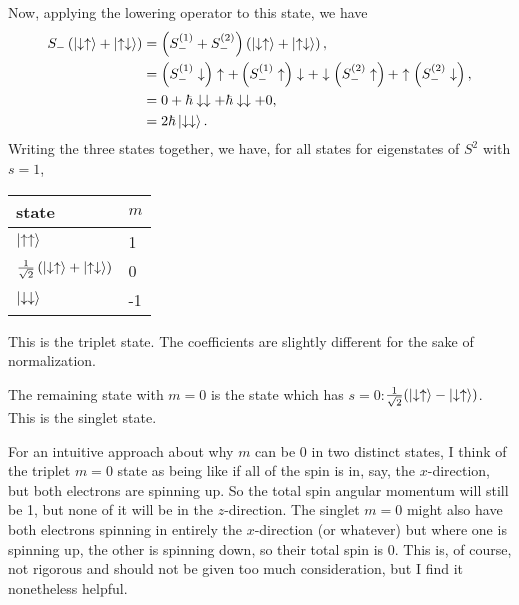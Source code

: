 \documentclass[11pt]{paper}
\begin{document}
Now, applying the lowering operator to this state, we have
\begin{align}
S_-\left(\ket{\downarrow\uparrow}+\ket{\uparrow\downarrow}\right) &=\left(S^{(1)}_-+S^{(2)}_-\right)\left(\ket{\downarrow\uparrow}+\ket{\uparrow\downarrow}\right),\\
&=\left(S_-^{(1)}\downarrow\right)\uparrow+\left(S_-^{(1)}\uparrow\right)\downarrow+\downarrow\left(S_-^{(2)}\uparrow\right)+\uparrow\left(S_-^{(2)}\downarrow\right),\\
&=0+\hbar\downarrow\downarrow + \hbar\downarrow\downarrow+0,\\
&=2\hbar\ket{\downarrow\downarrow}.
\end{align}
Writing the three states together, we have, for all states for eigenstates of $S^2$ with $s=1$,

\begin{table}[h]
\centering
\bgroup
\def\arraystretch{1.5}
\begin{tabular}{ll}
state                   & $m$                       \\ \hline
\multicolumn{1}{|l|}{$\ket{\uparrow\uparrow}$} & \multicolumn{1}{l|}{1}  \\ \hline
\multicolumn{1}{|l|}{$\frac{1}{\sqrt{2}}\left(\ket{\downarrow\uparrow}+\ket{\uparrow\downarrow}\right)$} & \multicolumn{1}{l|}{0}  \\ \hline
\multicolumn{1}{|l|}{$\ket{\downarrow\downarrow}$} & \multicolumn{1}{l|}{-1} \\ \hline
\end{tabular}
\egroup
\end{table}
This is the triplet state.  The coefficients are slightly different for the sake of normalization.

The remaining state with $m=0$ is the state which has $s=0$:$\frac{1}{\sqrt{2}}(\ket{\downarrow\uparrow}-\ket{\downarrow\uparrow})$.  This is the singlet state.

For an intuitive approach about why $m$ can be $0$ in two distinct states, I think of the triplet $m=0$ state as being like if all of the spin is in, say, the $x$-direction, but both electrons are spinning up.  So the total spin angular momentum will still be 1, but none of it will be in the $z$-direction.  The singlet $m=0$ might also have both electrons spinning in entirely the $x$-direction (or whatever) but where one is spinning up, the other is spinning down, so their total spin is 0.  This is, of course, not rigorous and should not be given too much consideration, but I find it nonetheless helpful.
\end{document}

